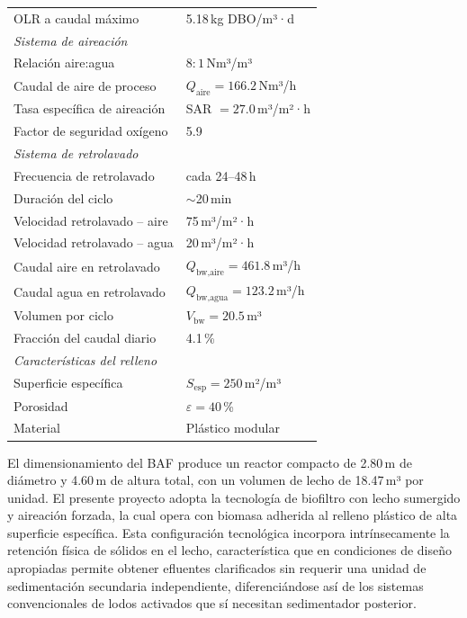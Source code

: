 \documentclass[12pt,a4paper]{article}
\begin{document}
\begin{longtable}{p{7cm}p{6cm}}
OLR a caudal máximo           & 5.18\,kg DBO/m³·d \\[4pt]
%
\multicolumn{2}{l}{\textit{Sistema de aireación}} \\[2pt]
Relación aire:agua            & $8:1$\,Nm³/m³ \\
Caudal de aire de proceso     & $Q_{\text{aire}} = 166.2$\,Nm³/h \\
Tasa específica de aireación  & SAR $= 27.0$\,m³/m²·h \\
Factor de seguridad oxígeno   & 5.9 \\[4pt]
%
\multicolumn{2}{l}{\textit{Sistema de retrolavado}} \\[2pt]
Frecuencia de retrolavado     & cada 24--48\,h \\
Duración del ciclo            & $\sim$20\,min \\
Velocidad retrolavado -- aire & 75\,m³/m²·h \\
Velocidad retrolavado -- agua & 20\,m³/m²·h \\
Caudal aire en retrolavado    & $Q_{\text{bw,aire}} = 461.8$\,m³/h \\
Caudal agua en retrolavado    & $Q_{\text{bw,agua}} = 123.2$\,m³/h \\
Volumen por ciclo             & $V_{\text{bw}} = 20.5$\,m³ \\
Fracción del caudal diario    & 4.1\,\% \\[4pt]
%
\multicolumn{2}{l}{\textit{Características del relleno}} \\[2pt]
Superficie específica         & $S_{\text{esp}} = 250$\,m²/m³ \\
Porosidad                     & $\varepsilon = 40$\,\% \\
Material                      & Plástico modular \\
\end{longtable}

El dimensionamiento del BAF produce un reactor compacto de 2.80\,m de diámetro y 4.60\,m de altura total, con un volumen de lecho de 18.47\,m³ por unidad. El presente proyecto adopta la tecnología de biofiltro con lecho sumergido y aireación forzada, la cual opera con biomasa adherida al relleno plástico de alta superficie específica. Esta configuración tecnológica incorpora intrínsecamente la retención física de sólidos en el lecho, característica que en condiciones de diseño apropiadas permite obtener efluentes clarificados sin requerir una unidad de sedimentación secundaria independiente, diferenciándose así de los sistemas convencionales de lodos activados que sí necesitan sedimentador posterior.
\end{document}

